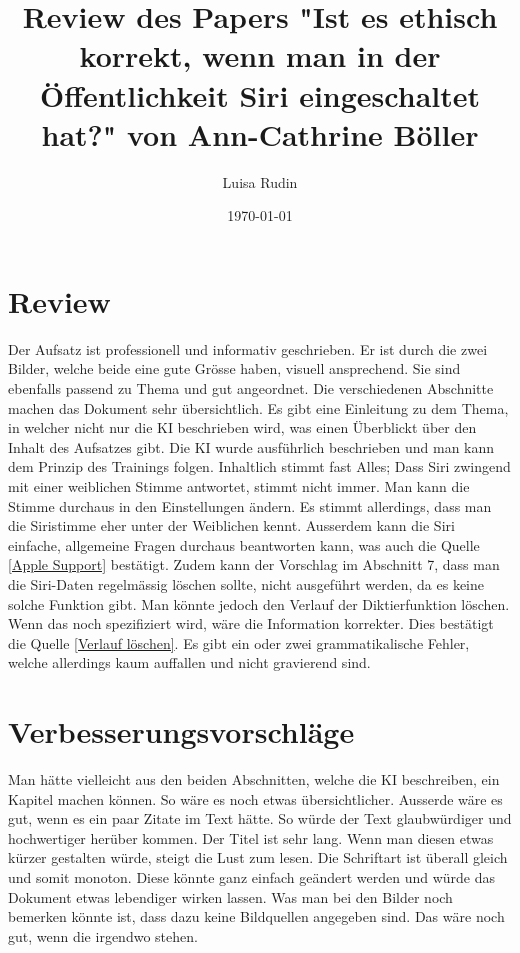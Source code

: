\documentclass{article}
\title{Review des Papers "Ist es ethisch korrekt, wenn man in der Öffentlichkeit Siri eingeschaltet hat?" von Ann-Cathrine Böller}
\author{Luisa Rudin}
\date{\today}
\begin{document}
\maketitle


\section{Review}
Der Aufsatz ist professionell und informativ geschrieben. Er ist durch die zwei Bilder, welche beide eine gute Grösse haben, visuell ansprechend. Sie sind ebenfalls passend zu Thema und gut angeordnet. Die verschiedenen Abschnitte machen das Dokument sehr übersichtlich. Es gibt eine Einleitung zu dem Thema, in welcher nicht nur die KI beschrieben wird, was einen Überblickt über den Inhalt des Aufsatzes gibt. Die KI wurde ausführlich beschrieben und man kann dem Prinzip des Trainings folgen. Inhaltlich stimmt fast Alles; Dass Siri zwingend mit einer weiblichen Stimme antwortet, stimmt nicht immer. Man kann die Stimme durchaus in den Einstellungen ändern. Es stimmt allerdings, dass man die Siristimme eher unter der Weiblichen kennt. Ausserdem kann die Siri einfache, allgemeine Fragen durchaus beantworten kann, was auch die Quelle \ref{Apple Support} bestätigt. Zudem kann der Vorschlag im Abschnitt 7, dass man die Siri-Daten regelmässig löschen sollte, nicht ausgeführt werden, da es keine solche Funktion gibt. Man könnte jedoch den Verlauf der Diktierfunktion löschen. Wenn das noch spezifiziert wird, wäre die Information korrekter. Dies bestätigt die Quelle \ref{Verlauf löschen}. Es gibt ein oder zwei grammatikalische Fehler, welche allerdings kaum auffallen und nicht gravierend sind. 

\section{Verbesserungsvorschläge}
Man hätte vielleicht aus den beiden Abschnitten, welche die KI beschreiben, ein Kapitel machen können. So wäre es noch etwas übersichtlicher. Ausserde wäre es gut, wenn es ein paar Zitate im Text hätte. So würde der Text glaubwürdiger und hochwertiger herüber kommen. Der Titel ist sehr lang. Wenn man diesen etwas kürzer gestalten würde, steigt die Lust zum lesen. Die Schriftart ist überall gleich und somit monoton. Diese könnte ganz einfach geändert werden und würde das Dokument etwas lebendiger wirken lassen. Was man bei den Bilder noch bemerken könnte ist, dass dazu keine Bildquellen angegeben sind. Das wäre noch gut, wenn die irgendwo stehen. 
\end{document}
